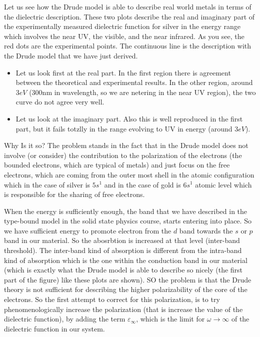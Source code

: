 \documentclass[../main/main.tex]{subfiles}
\begin{document}
Let us see how the Drude model is able to describe real world metals in terms of the dielectric description. These two plots describe the real and imaginary part of the experimentally measured dielectric function for silver in the energy range which involves the near UV, the visible, and the near infrared.
As you see, the red dots are the experimental points. The continuous line is the description with the Drude model that we have just derived.
\begin{itemize}
\item Let us look first at the real part. In the first region there is agreement between the theoretical and experimental results. In the other region, around \( 3 eV \) (300nm in wavelength, so we are netering in the near UV region), the two curve do not agree very well.
\item Let us look at the imaginary part. Also this is well reproduced in the first part, but it fails totzlly in the range evolving to UV in energy (around \( 3eV \)).
\end{itemize}
Why Is it so? The problem stands in the fact that in the Drude model does not involve (or consider) the contribution to the polarization of the electrons (the bounded electrons, which are typical of metals) and just focus on the free electrons, which are coming from the outer most shell in the atomic configuration which in the case of silver is \( 5s^1 \) and in the case of gold is \( 6s^1 \) atomic level which is responsible for the sharing of free electrons.

When the energy is sufficiently enough, the band that we have described in the type-bound model in the solid state physics course, starts entering into place. So we have sufficient energy to promote electron from the \( d \) band towards the \( s \) or \( p \) band in our material. So the abosrbtion is increased at that level (inter-band threshold). The inter-band kind of absorption is different from the intra-band kind of absorption which is the one within the conduction band in our material (which is exactly what the Drude model is able to describe so nicely (the first part of the figure) like these plots are shown). SO the problem is that the Drude theory is not sufficient for describing the higher polarizability of the core of the electrons. So the first attempt to correct for this polarization, is to try phenomenologically increase the polarization (that is increase the value of the dielectric function), by adding the term \( \varepsilon _ \infty  \), which is the limit for \( \omega \rightarrow  \infty  \)  of the dielectric function in our system.
\end{document}
